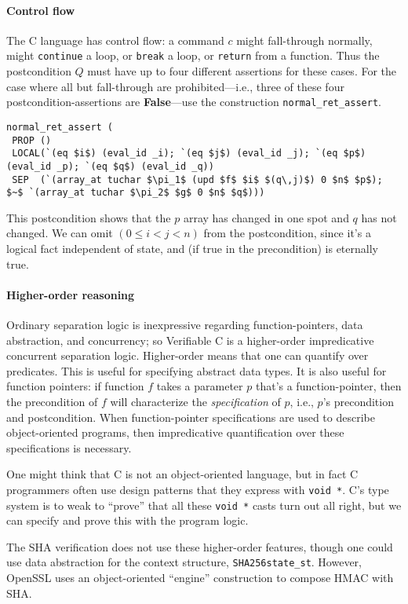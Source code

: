 \documentclass[prodmode,acmtoplas]{acmsmall}
\begin{document}
\paragraph{Control flow}
The C language has control flow: a command $c$ might fall-through normally,
might \texttt{continue} a loop, or \texttt{break} a loop,
or \texttt{return} from a function.  Thus the postcondition $Q$
must have up to four different assertions for these cases.
For the case where all but fall-through are prohibited---i.e., three of these four postcondition-assertions are \textbf{False}---use
the construction \lstinline{normal_ret_assert}.
\begin{lstlisting}
normal_ret_assert (
 PROP ()
 LOCAL(`(eq $i$) (eval_id _i); `(eq $j$) (eval_id _j); `(eq $p$) (eval_id _p); `(eq $q$) (eval_id _q))
 SEP  (`(array_at tuchar $\pi_1$ (upd $f$ $i$ $(q\,j)$) 0 $n$ $p$); $~$ `(array_at tuchar $\pi_2$ $g$ 0 $n$ $q$)))
\end{lstlisting}
This postcondition
shows that the $p$ array has changed in one spot
and $q$ has not changed.  We can omit $(0\le i<j<n)$
from the postcondition, since it's a logical fact independent
of state, and (if true in the precondition)
is eternally true.

\paragraph{Higher-order reasoning}
Ordinary separation logic is inexpressive regarding
function-pointers, data abstraction, and concurrency;
so Verifiable C is a higher-order impredicative
concurrent separation logic.  
Higher-order means that one can quantify over
predicates.  This is useful for specifying
abstract data types.  It is also useful for
function pointers:  if function $f$
takes a parameter $p$ that's a function-pointer,
then the precondition of $f$ will characterize
the \emph{specification} of $p$, i.e.,
$p$'s precondition and postcondition.
When function-pointer specifications
are used to describe object-oriented
programs, then impredicative
quantification over these
specifications is necessary.

One might think that C is not an object-oriented
language, but in fact C programmers often use
design patterns that they express with \lstinline{void *}.
C's type system is to weak to ``prove'' that all these
\lstinline{void *} casts turn out all right, but we
can specify and prove this with the program logic.

The SHA verification
does not use these higher-order features,
though one could use data abstraction for
the context structure, \lstinline{SHA256state_st}.
However, OpenSSL uses an object-oriented
``engine'' construction to compose HMAC with SHA.
\end{document}
